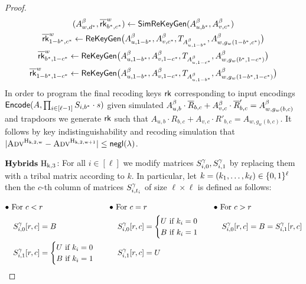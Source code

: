 \begin{proof}
\begin{gather*}
(A^{\beta}_{w,d^*}, \overline{{\mathsf{rk}}}^w_{b^*,c^*})\leftarrow{\mathsf{SimReKeyGen}}(A^{\beta}_{u,b^*},A^{\beta}_{v,c^*})\\
         \overline{{\mathsf{rk}}}^w_{1-b^*,c^*}\leftarrow{\mathsf{ReKeyGen}}\big(A^{\beta}_{u,1-b^*},A^{\beta}_{v,c^*},T_{A^{\beta}_{u,1-b^*}},A^{\beta}_{w,g_w(1-b^*,c^*)}\big) \\
       \overline{{\mathsf{rk}}}^w_{b^*,1-c^*}\leftarrow{\mathsf{ReKeyGen}}\big(A^{\beta}_{u,1-b^*},A^{\beta}_{v,1-c^*},T_{A^{\beta}_{u,1-c^*}},A^{\beta}_{w,g_w(b^*,1-c^*)}\big) \\  \overline{{\mathsf{rk}}}^w_{1-b^*,1-c^*}\leftarrow{\mathsf{ReKeyGen}}\big(A^{\beta}_{u,1-b^*},A^{\beta}_{v,1-c^*},T_{A^{\beta}_{u,1-b^*}},A^{\beta}_{w,g_w(1-b^*,1-c^*)}\big)
     \end{gather*}
\EI
In order to program the final recoding keys ${\mathsf{rk}}$ corresponding to input encodings ${\mathsf{Encode}}(A, \prod_{i\in[\ell-1]} S_{i,b^*}\cdot s)$ given simulated $A^{\beta}_{u,b}\cdot \overline R_{b,c}+A^{\beta}_{v,c}\cdot \overline R'_{b,c}=A^{\beta}_{w,g_w(b,c)}$ and trapdoors we generate ${\mathsf{rk}}$ such that 
$A_{u,b}\cdot R_{b,c}+A_{v,c}\cdot  R'_{b,c}=A_{w,g_w(b,c)}$.  
It follows by key indistinguishability and recoding simulation that $|\textsc{Adv}^{\mathrm{\mathrm{H}_{k,2,w}}}-\textsc{Adv}^{\mathrm{\mathrm{H}_{k,2,w+1}}}|\leq{{\mathsf{negl}}}(\lambda)$.  

\item[] ${\bf Hybrids}~ \mathrm{\mathrm{H}_{k,3}}$: For all $i\in[\ell]$ we modify matrices $S^{\sc \gamma}_{i,0},S^{\sc \gamma}_{i,1}$ by replacing them with a tribal matrix according to $k$. In particular, let $k=(k_1,\ldots,k_\ell)\in\{0,1\}^\ell$ then the $c$-th
column of matrices $S^{\sc \gamma}_{i,t_i}$ of size $\ell\times\ell$ is defined as follows: 

\begin{align*}
\bullet~\text{For}~  &c<r           & \bullet~ \text{For}~  &c=r             &  \bullet~\text{For}~&c>r\\
S^{\sc \gamma}_{i,0}&  [r,c]=B    &  S^{\sc \gamma}_{i,0}&[r,c]=\begin{cases}U~ \text{if}~ k_i=0\\B~ \text{if}~ k_i=1 \end{cases}   &  S^{\sc \gamma}_{i,0}&[r,c]=B= S^{\sc \gamma}_{i,1}[r,c]\\
S^{\sc \gamma}_{i,1}&[r,c]=\begin{cases}U~ \text{if}~ k_i=0\\B~ \text{if}~ k_i=1 \end{cases}  &  S^{\sc \gamma}_{i,1}&   [r,c]=U        &  & 
\end{align*}
\EE
\end{proof}




